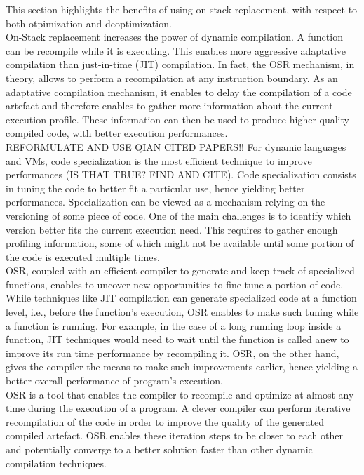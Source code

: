 This section highlights the benefits of using on-stack replacement, with respect to both otpimization and deoptimization.\\

On-Stack replacement increases the power of dynamic compilation.
A function can be recompile while it is executing.
This enables more aggressive adaptative compilation than just-in-time (JIT) compilation.
In fact, the OSR mechanism, in theory, allows to perform a recompilation at any instruction boundary. 
As an adaptative compilation mechanism, it enables to delay the compilation of a code artefact and therefore enables to gather more information about the current execution profile.
These information can then be used to produce higher quality compiled code, with better execution performances.\\

REFORMULATE AND USE QIAN CITED PAPERS!!
For dynamic languages and VMs, code specialization is the most efficient technique to improve performances (IS THAT TRUE? FIND AND CITE).
Code specialization consists in tuning the code to better fit a particular use, hence yielding better performances.
Specialization can be viewed as a mechanism relying on the versioning of some piece of code.
One of the main challenges is to identify which version better fits the current execution need.
This requires to gather enough profiling information, some of which might not be available until some portion of the code is executed multiple times.\\

OSR, coupled with an efficient compiler to generate and keep track of specialized functions, enables to uncover new opportunities to fine tune a portion of code.
While techniques like JIT compilation can generate specialized code at a function level, i.e., before the function's execution, OSR enables to make such tuning while a function is running.
For example, in the case of a long running loop inside a function, JIT techniques would need to wait until the function is called anew to improve its run time performance by recompiling it. 
OSR, on the other hand, gives the compiler the means to make such improvements earlier, hence yielding a better overall performance of program's execution.\\

OSR is a tool that enables the compiler to recompile and optimize at almost any time during the execution of a program.
A clever compiler can perform iterative recompilation of the code in order to improve the quality of the generated compiled artefact.
OSR enables these iteration steps to be closer to each other and potentially converge to a better solution faster than other dynamic compilation techniques.\\

